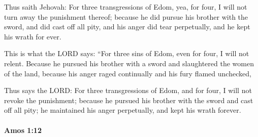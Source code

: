 			\begin{versebox}
					\item[BHS] 
					\item[LXX] 
					\item[ASV] Thus saith Jehovah: For three transgressions of Edom, yea, for four, I will not turn away the punishment thereof; because he did pursue his brother with the sword, and did cast off all pity, and his anger did tear perpetually, and he kept his wrath for ever.
					\item[NIV] This is what the LORD says: “For three sins of Edom, even for four, I will not relent. Because he pursued his brother with a sword and slaughtered the women of the land, because his anger raged continually and his fury flamed unchecked,
					\item[NRSV] Thus says the LORD: For three transgressions of Edom, and for four, I will not revoke the punishment; because he pursued his brother with the sword and cast off all pity; he maintained his anger perpetually, and kept his wrath forever.
			\end{versebox}

		\paragraph{Amos 1:12} %
			\label{AMOS-1-12}

